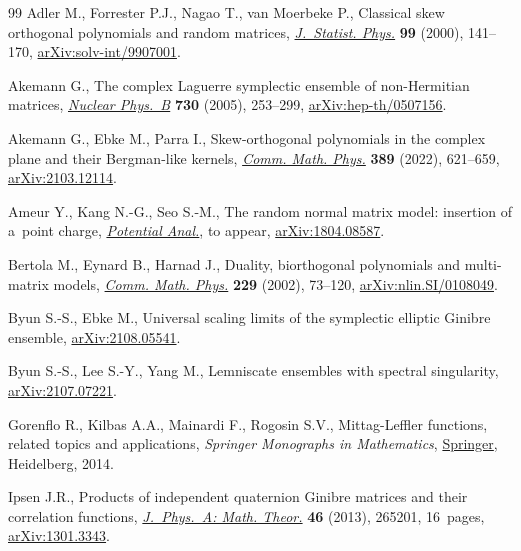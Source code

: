 \documentclass[11pt]{article}
\numberwithin{equation}{section}
\numberwithin{equation}{section}
\newcommand{\1}{\chi}
\begin{document}
\begin{thebibliography}{99}
Adler M., Forrester P.J., Nagao T., van Moerbeke P., Classical skew orthogonal
 polynomials and random matrices, \href{https://doi.org/10.1023/A:1018644606835}{\textit{J.~Statist. Phys.}} \textbf{99}
 (2000), 141--170, \href{https://arxiv.org/abs/solv-int/9907001}{arXiv:solv-int/9907001}.

Akemann G., The complex {L}aguerre symplectic ensemble of non-{H}ermitian
 matrices, \href{https://doi.org/10.1016/j.nuclphysb.2005.09.039}{\textit{Nuclear Phys.~B}} \textbf{730} (2005), 253--299,
 \href{https://arxiv.org/abs/hep-th/0507156}{arXiv:hep-th/0507156}.

Akemann G., Ebke M., Parra I., Skew-orthogonal polynomials in the complex plane
 and their {B}ergman-like kernels, \href{https://doi.org/10.1007/s00220-021-04230-8}{\textit{Comm. Math. Phys.}} \textbf{389}
 (2022), 621--659, \href{https://arxiv.org/abs/2103.12114}{arXiv:2103.12114}.

Ameur Y., Kang N.-G., Seo S.-M., The random normal matrix model: insertion of
 a~point charge, \href{https://doi.org/10.1007/s11118-021-09942-z}{\textit{Potential Anal.}}, {t}o appear, \href{https://arxiv.org/abs/1804.08587}{arXiv:1804.08587}.

Bertola M., Eynard B., Harnad J., Duality, biorthogonal polynomials and
 multi-matrix models, \href{https://doi.org/10.1007/s002200200663}{\textit{Comm. Math. Phys.}} \textbf{229} (2002), 73--120,
 \href{https://arxiv.org/abs/nlin.SI/0108049}{arXiv:nlin.SI/0108049}.

Byun S.-S., Ebke M., Universal scaling limits of the symplectic elliptic
 {G}inibre ensemble, \href{https://arxiv.org/abs/2108.05541}{arXiv:2108.05541}.

Byun S.-S., Lee S.-Y., Yang M., Lemniscate ensembles with spectral singularity,
 \href{https://arxiv.org/abs/2107.07221}{arXiv:2107.07221}.

Gorenflo R., Kilbas A.A., Mainardi F., Rogosin S.V., Mittag-{L}effler
 functions, related topics and applications, \textit{Springer Monographs in
 Mathematics}, \href{https://doi.org/10.1007/978-3-662-43930-2}{Springer}, Heidelberg, 2014.

Ipsen J.R., Products of independent quaternion {G}inibre matrices and their
 correlation functions, \href{https://doi.org/10.1088/1751-8113/46/26/265201}{\textit{J.~Phys.~A: Math. Theor.}} \textbf{46} (2013),
 265201, 16~pages, \href{https://arxiv.org/abs/1301.3343}{arXiv:1301.3343}.


\end{thebibliography}
\end{document}
